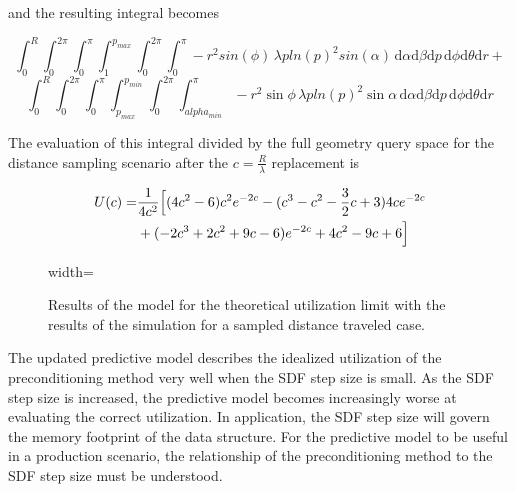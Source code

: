 and the resulting integral becomes

$$ \int_{0}^{R}\int_{0}^{2\pi}\int_{0}^{\pi}\int_{1}^{p_{max}}\int_{0}^{2\pi}\int_{0}^{\pi}
-r^2sin(\phi) \, \lambda p ln(p)^2 sin(\alpha) \, \mathrm{d}\alpha \mathrm{d}\beta \mathrm{d}p \, \mathrm{d}\phi
\mathrm{d}\theta \mathrm{d}r + $$
$$ \int_{0}^{R}\int_{0}^{2\pi}\int_{0}^{\pi}\int_{p_{max}}^{p_{min}}\int_{0}^{2\pi}\int_{alpha_{min}}^{\pi}
-r^2\sin{\phi} \, \lambda p ln(p)^2 \sin{\alpha} \, \mathrm{d}\alpha \mathrm{d}\beta \mathrm{d}p \, \mathrm{d}\phi
\mathrm{d}\theta \mathrm{d}r $$

The evaluation of this integral divided by the full geometry query space for the
distance sampling scenario after the $c=\frac{R}{\lambda}$ replacement is

\begin{align*}
  U(c) = &\frac{1}{4c^{2}} \Big{[} (4 c^2-6) c^2e^{-2c} - (c^3-c^2-\frac{3}{2} c+3)4ce^{-2c} \\
    &+ (-2 c^3+2c^2+9c-6) e^{-2c}+4c^2-9 c+6 \Big{]}
\end{align*}

\begin{figure}[ht] 
\centering
{width=\textwidth}
\caption{Results of the model for the theoretical utilization limit with the
  results of the simulation for a sampled distance traveled case.}
\label{fig:sdf_sampled_dist}
\end{figure}

The updated predictive model describes the idealized utilization of the
preconditioning method very well when the SDF step size is small. As the SDF
step size is increased, the predictive model becomes increasingly worse at
evaluating the correct utilization. In application, the SDF step size will
govern the memory footprint of the data structure. For the predictive model to
be useful in a production scenario, the relationship of the preconditioning
method to the SDF step size must be understood.





